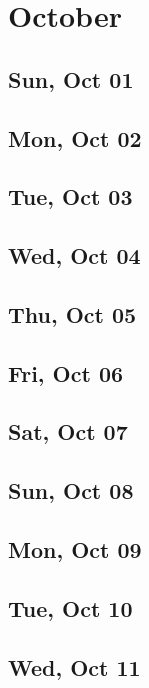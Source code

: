 \chapter{October}
	\section{Sun, Oct 01}
		
	\section{Mon, Oct 02}
		
	\section{Tue, Oct 03}
		
	\section{Wed, Oct 04}
		
	\section{Thu, Oct 05}
		
	\section{Fri, Oct 06}
		
	\section{Sat, Oct 07}
		
	\section{Sun, Oct 08}
		
	\section{Mon, Oct 09}
		
	\section{Tue, Oct 10}
		
	\section{Wed, Oct 11}
		
